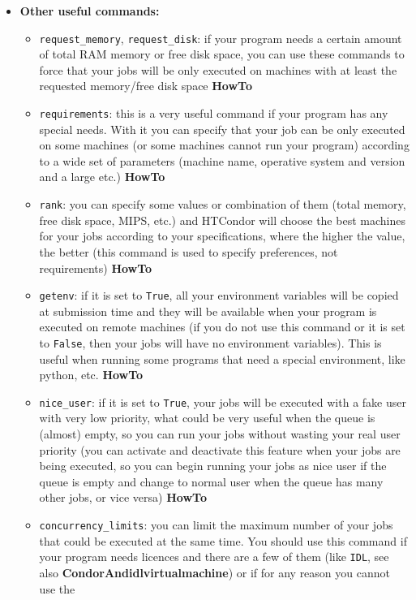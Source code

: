 \documentclass[a4paper,10pt]{article}
\begin{document}
\begin{itemize}
\item \textbf{Other useful commands:}
\begin{itemize}
\item \texttt{request\_memory}, \texttt{request\_disk}: if your program needs a certain amount of
total RAM memory or free disk space, you can use these commands to force
that your jobs will be only executed on machines with at least the requested
memory/free disk space \textbf{HowTo}
\item \texttt{requirements}: this is a very useful command if your program has any
special needs. With it you can specify that your job can be only executed on
some machines (or some machines cannot run your program) according to a wide
set of parameters (machine name, operative system and version and a large
etc.) \textbf{HowTo}
\item \texttt{rank}: you can specify some values or combination of them (total memory,
free disk space, MIPS, etc.) and HTCondor will choose the best machines for
your jobs according to your specifications, where the higher the value, the
better (this command is used to specify preferences, not requirements)
\textbf{HowTo}
\item \texttt{getenv}: if it is set to \texttt{True}, all your environment variables will be
copied at submission time and they will be available when your program is
executed on remote machines (if you do not use this command or it is set to
\texttt{False}, then your jobs will have no environment variables). This is useful
when running some programs that need a special environment, like python,
etc. \textbf{HowTo}
\item \texttt{nice\_user}: if it is set to \texttt{True}, your jobs will be executed with a fake
user with very low priority, what could be very useful when the queue is
(almost) empty, so you can run your jobs without wasting your real user
priority (you can activate and deactivate this feature when your jobs are
being executed, so you can begin running your jobs as nice user if the queue
is empty and change to normal user when the queue has many other jobs, or
vice versa) \textbf{HowTo}
\item \texttt{concurrency\_limits}: you can limit the maximum number of your jobs that
could be executed at the same time. You should use this command if your
program needs licences and there are a few of them (like \texttt{IDL}, see also
\textbf{CondorAndidlvirtualmachine}) or if for any reason you cannot use the

\end{itemize}
\end{itemize}
\end{document}
